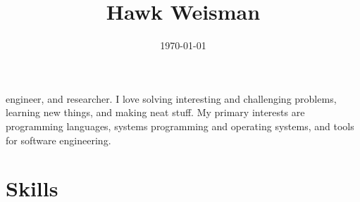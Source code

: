\documentclass[a4paper]{tufte-handout}
\title{Hawk Weisman}
\date{}
\begin{document}
\date{\today}
\maketitle


\noindent
{} engineer, and researcher. I love solving interesting and challenging problems, learning new things, and making neat stuff. My primary interests are programming languages, systems programming and operating systems, and tools for software engineering.

\section{Skills}
\end{document}
